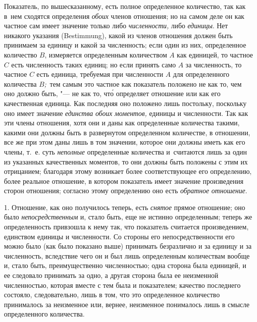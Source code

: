 Показатель, по вышесказанному, есть полное определенное количество, так как
в~нем сходятся определения {\em обоих} членов отношения; но на самом деле он
как частное сам имеет значение только либо {\em численности,} либо
{\em единицы}. Нет никакого указания (Bestimmung), какой из членов отношения
должен быть принимаем за единицу и какой за численность; если один из них,
определенное количество $B$, измеряется определенным количеством $A$ как
единицей, то частное $C$ есть численность таких единиц; но если принять само
$A$ за численность, то частное $C$ есть единица, требуемая при численности $A$
для определенного количества $B${\em ;\,} тем самым это частное как показатель
положено не как то, чем оно должно быть, "--- не как то, чт\'{о} определяет
отношение или как его качественная единица. Как последняя оно положено лишь
постольку, поскольку оно имеет значение {\em единства обоих моментов,} единицы
и численности. Так как эти члены отношения, хотя они и даны как определенные
количества такими, какими они должны быть в развернутом определенном
количестве, в отношении, все же при этом даны лишь в том значении, которое они
должны иметь как его члены, т.~е. суть {\em неполные} определенные количества
и~считаются лишь за один из указанных качественных моментов, то они должны быть
положены с этим их отрицанием; благодаря этому возникает более соответствующее
его определению, более реальное отношение, в котором показатель имеет значение
произведения сторон отношения; согласно этому определению оно есть
{\em обратное отношение}.


1. Отношение, как оно получилось теперь, есть {\em снятое} прямое отношение;
оно было {\em непосредственным} и, стало быть, еще не истинно определенным;
теперь же определенность привзошла к нему так, что показатель считается
произведением, единством единицы и численности. Со стороны его
непосредственности его можно было (как было показано выше) принимать
безразлично и за единицу и за численность, вследствие чего он и был лишь
определенным количествам вообще и, стало быть, преимущественно численностью;
одна сторона была единицей, и ее следовало принимать за одно, а другая сторона
была ее неизменной численностью, которая вместе с тем была и показателем;
качество последнего состояло, следовательно, лишь в том, что это определенное
количество принималось за неизменное или, вернее, неизменное понималось лишь в
смысле определенного количества.

